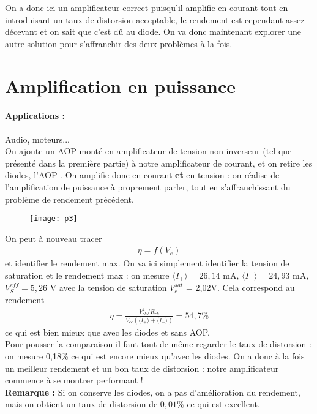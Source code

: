 \documentclass[12pt,prb,aps,epsf]{article}
\begin{document}
On a donc ici un amplificateur correct puisqu'il amplifie en courant tout en introduisant un taux de distorsion acceptable, le rendement est cependant assez décevant et on sait que c'est dû au diode. On va donc maintenant explorer une autre solution pour s'affranchir des deux problèmes à la fois.

\section{Amplification en puissance}
\paragraph{Applications :} Audio, moteurs...\\

On ajoute un AOP monté en amplificateur de tension non inverseur (tel que présenté dans la première partie) à notre amplificateur de courant, et on retire les diodes, l'AOP . On amplifie donc en courant \textbf{et} en tension : on réalise de l'amplification de puissance à proprement parler, tout en s'affranchissant du problème de rendement précédent.

\begin{figure}[h]
	\centering \texttt{[image: p3]}
\end{figure}

On peut à nouveau tracer 
\begin{eqnarray}
\eta = f(V_e) 
\end{eqnarray}
et identifier le rendement max. On va ici simplement identifier la tension de saturation et le rendement max : on mesure $\langle I_+ \rangle = 26,14$ mA, $\langle I_- \rangle = 24,93$ mA, $V_S^{eff} = 5,26$ V avec la tension de saturation $V_e^{sat}$ = 2,02V. Cela correspond au rendement 
\begin{eqnarray}
\eta =  \frac{V_{ch}^2/R_{ch}}{V_{cc}(\langle I_+ \rangle + \langle I_- \rangle)} = 54,7 \%
\end{eqnarray}
ce qui est bien mieux que avec les diodes et sans AOP.\\

Pour pousser la comparaison il faut tout de même regarder le taux de distorsion : on mesure 0,18\% ce qui est encore mieux qu'avec les diodes. On a donc à la fois un meilleur rendement et un bon taux de distorsion : notre amplificateur commence à se montrer performant !\\

\textbf{Remarque :} Si on conserve les diodes, on a pas d'amélioration du rendement, mais on obtient un taux de distorsion de $0,01$\% ce qui est excellent.\\ 
\end{document}
